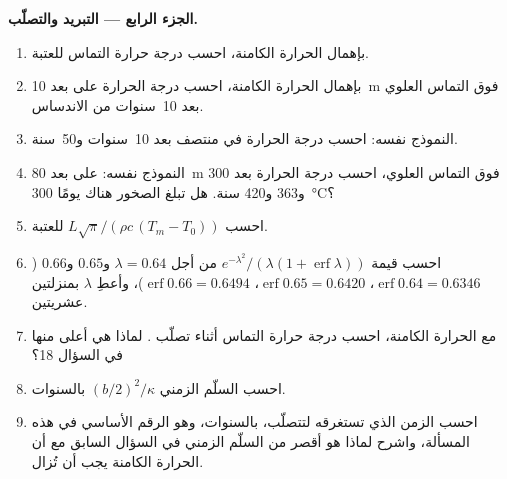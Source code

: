 \begin{problem}
\noindent\textbf{الجزء الرابع --- التبريد والتصلّب.}
\begin{enumerate}[resume]
\item بإهمال الحرارة الكامنة، احسب درجة حرارة التماس للعتبة.
\item بإهمال الحرارة الكامنة، احسب درجة الحرارة على بعد \qty{10}{m} فوق التماس
العلوي بعد \num{10}~سنوات من الاندساس.
\item النموذج نفسه: احسب درجة الحرارة في منتصف  بعد
\num{10}~سنوات و\num{50}~سنة.
\item النموذج نفسه: على بعد \qty{80}{m} فوق التماس العلوي، احسب درجة الحرارة بعد
\num{300} و\num{363} و\num{420} سنة. هل تبلغ الصخور هناك يومًا
\qty{300}{\celsius}؟
\item احسب $L\sqrt\pi/(\rho c\,(T_m - T_0))$ للعتبة.
\item احسب قيمة $e^{-\lambda^2}/(\lambda(1 + \operatorname{erf}\lambda))$ من أجل $\lambda = 0.64$
و$0.65$ و$0.66$ ($\operatorname{erf}0.64 = 0.6346$، $\operatorname{erf}0.65 = 0.6420$،
$\operatorname{erf}0.66 = 0.6494$)، وأعطِ $\lambda$ بمنزلتين عشريتين.
\item مع الحرارة الكامنة، احسب درجة حرارة التماس أثناء تصلّب
. لماذا هي أعلى منها في السؤال 18؟
\item احسب السلّم الزمني $(b/2)^2/\kappa$ بالسنوات.
\item احسب الزمن الذي تستغرقه  لتتصلّب، بالسنوات، وهو الرقم الأساسي في
هذه المسألة، واشرح لماذا هو أقصر من السلّم الزمني في السؤال
السابق مع أن الحرارة الكامنة يجب أن تُزال.
\end{enumerate}
\end{problem}
